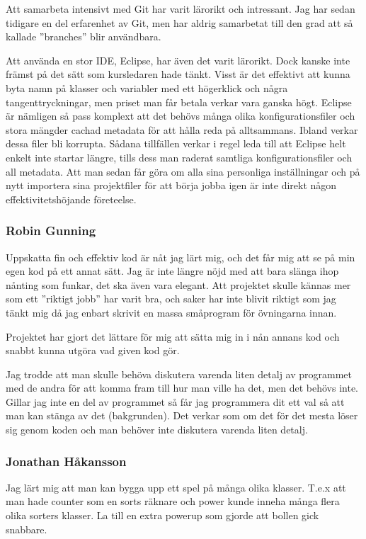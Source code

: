 \documentclass[a4paper,11pt]{article}
\begin{document}
Att samarbeta intensivt med Git har varit lärorikt och intressant. Jag
har sedan tidigare en del erfarenhet av Git, men har aldrig samarbetat till den grad att så kallade
''branches'' blir användbara.

Att använda en stor IDE, Eclipse, har även det varit lärorikt. Dock kanske inte främst på det sätt
som kursledaren hade tänkt. Visst är det effektivt att kunna byta namn på klasser och variabler med
ett högerklick och några tangenttryckningar, men priset man får betala verkar vara ganska högt. Eclipse
är nämligen så pass komplext att det behövs många olika konfigurationsfiler och stora mängder cachad
metadata för att hålla reda på alltsammans. Ibland verkar dessa filer bli korrupta. Sådana
tillfällen verkar i regel leda till att Eclipse helt enkelt inte startar
längre, tills dess man raderat samtliga konfigurationsfiler och all metadata. Att man sedan får göra
om alla sina personliga inställningar och på nytt importera sina projektfiler för att börja jobba
igen är inte direkt någon effektivitetshöjande företeelse.

\subsubsection{Robin Gunning}
Uppskatta fin och effektiv kod är nåt jag lärt mig, och det får mig att se på min egen kod på ett annat 
sätt. Jag är inte längre nöjd med att bara slänga ihop nånting som funkar, det ska även vara elegant.
Att projektet skulle kännas mer som ett ''riktigt jobb'' har varit bra, och saker har inte blivit riktigt
som jag tänkt mig då jag enbart skrivit en massa småprogram för övningarna innan.

Projektet har gjort det lättare för mig att sätta mig in i nån annans kod och snabbt kunna utgöra vad 
given kod gör.

Jag trodde att man skulle behöva diskutera varenda liten detalj av programmet med de andra för att komma 
fram till hur man ville ha det, men det behövs inte. Gillar jag inte en del av programmet så får jag programmera 
dit ett val så att man kan stänga av det (bakgrunden). Det verkar som om det för det mesta löser sig genom koden
och man behöver inte diskutera varenda liten detalj.

\subsubsection{Jonathan Håkansson}
Jag lärt mig att man kan bygga upp ett spel på många olika klasser. T.e.x att
 man hade counter som en sorts räknare och power kunde inneha många flera olika sorters klasser. La till en extra powerup som gjorde att bollen gick snabbare. 
\end{document}
